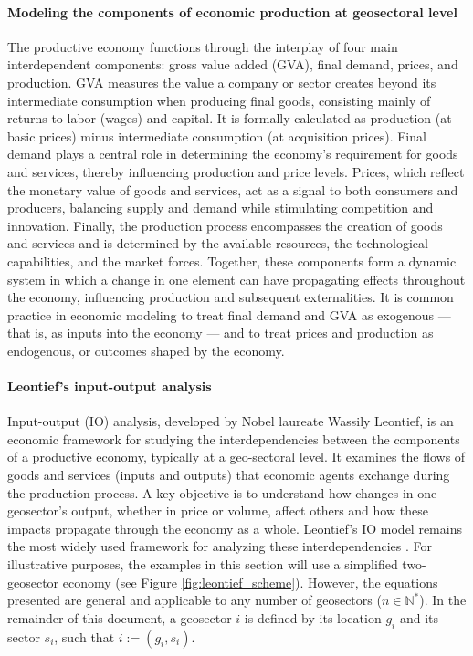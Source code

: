 \documentclass{article}
\begin{document}
\paragraph{Modeling the components of economic production at geosectoral level}
The productive economy functions through the interplay of four main interdependent components: gross value added (GVA), final demand, prices, and production. GVA measures the value a company or sector creates beyond its intermediate consumption when producing final goods, consisting mainly of returns to labor (wages) and capital. It is formally calculated as production (at basic prices) minus intermediate consumption (at acquisition prices). Final demand plays a central role in determining the economy's requirement for goods and services, thereby influencing production and price levels. Prices, which reflect the monetary value of goods and services, act as a signal to both consumers and producers, balancing supply and demand while stimulating competition and innovation. Finally, the production process encompasses the creation of goods and services and is determined by the available resources, the technological capabilities, and the market forces. Together, these components form a dynamic system in which a change in one element can have propagating effects throughout the economy, influencing production and subsequent externalities. It is common practice in economic modeling to treat final demand and GVA as exogenous --- that is, as inputs into the economy --- and to treat prices and production as endogenous, or outcomes shaped by the economy.


\paragraph{Leontief's input-output analysis} 
Input-output (IO) analysis, developed by Nobel laureate Wassily Leontief, is an economic framework for studying the interdependencies between the components of a productive economy, typically at a geo-sectoral level. It examines the flows of goods and services (inputs and outputs) that economic agents exchange during the production process. A key objective is to understand how changes in one geosector's output, whether in price or volume, affect others and how these impacts propagate through the economy as a whole. Leontief's IO model remains the most widely used framework for analyzing these interdependencies \cite{leontief1949structural}.
For illustrative purposes, the examples in this section will use a simplified two-geosector economy (see Figure \ref{fig:leontief_scheme}). However, the equations presented are general and applicable to any number of geosectors ($n \in \mathbb{N}^*$). In the remainder of this document, a geosector $i$ is defined by its location $g_i$ and its sector $s_i$, such that $i:=(g_i,s_i)$.
\end{document}
